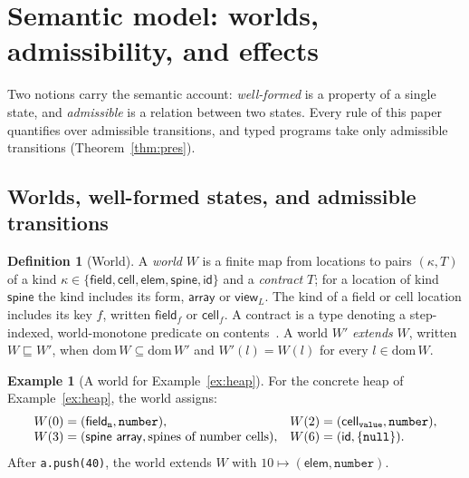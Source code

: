 \documentclass[10pt,a4paper]{article}
\theoremstyle{definition}
\newtheorem{definition}[theorem]{Definition}
\newtheorem{example}[theorem]{Example}
\theoremstyle{remark}
\newcommand{\code}[1]{\texttt{#1}}
\newcommand{\kF}{\mathsf{field}}\newcommand{\kC}{\mathsf{cell}}\newcommand{\kE}{\mathsf{elem}}\newcommand{\kS}{\mathsf{spine}}\newcommand{\kI}{\mathsf{id}}
\begin{document}
\section{Semantic model: worlds, admissibility, and effects}\label{sec:semantics}

Two notions carry the semantic account: \emph{well-formed} is a property
of a single state, and \emph{admissible} is a relation between two states.
Every rule of this paper quantifies over admissible transitions, and
typed programs take only admissible transitions (Theorem~\ref{thm:pres}).

\subsection{Worlds, well-formed states, and admissible transitions}

\begin{definition}[World]\label{def:world}
A \emph{world} $W$ is a finite map from locations to pairs
$(\kappa,T)$ of a kind $\kappa\in\{\kF,\kC,\kE,\kS,\kI\}$ and a \emph{contract}
$T$; for a location of kind $\kS$ the kind includes its form,
$\mathsf{array}$ or $\mathsf{view}_L$. The kind of a field or cell
location includes its key $f$, written $\kF_f$ or $\kC_f$. A contract
is a type denoting a step-indexed, world-monotone predicate on
contents~\cite{ahmed}. A world $W'$ \emph{extends} $W$, written
$W\sqsubseteq W'$, when $\mathrm{dom}\,W\subseteq\mathrm{dom}\,W'$ and
$W'(l)=W(l)$ for every $l\in\mathrm{dom}\,W$.
\end{definition}

\begin{example}[A world for Example~\ref{ex:heap}]
For the concrete heap of Example~\ref{ex:heap}, the world assigns:
{\small\begin{displaymath}
\begin{array}{@{}ll@{}}
W(0)=(\kF_{\code{n}},\code{number}), & W(2)=(\kC_{\code{value}},\code{number}),\\
W(3)=(\kS\ \mathsf{array},\text{spines of number cells}), & W(6)=(\kI,\{\code{null}\}).
\end{array}
\end{displaymath}}
After \code{a.push(40)}, the world extends $W$ with
$10\mapsto(\kE,\code{number})$.
\end{example}
\end{document}
